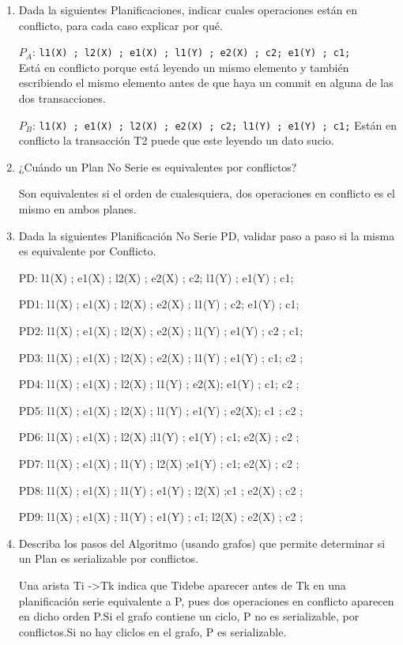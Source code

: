 \begin{enumerate}
\item Dada la siguientes Planificaciones, indicar cuales operaciones están en conflicto, para cada caso explicar por qué.

$P_A$: \texttt{l1(X) ; l2(X) ; e1(X) ; l1(Y) ; e2(X) ; c2; e1(Y) ; c1;}
\\
Está en conflicto porque está leyendo un mismo elemento y también escribiendo el mismo elemento antes de que haya un commit en alguna de las dos transacciones.

$P_B$: \texttt{l1(X) ; e1(X) ; l2(X) ; e2(X) ; c2; l1(Y) ; e1(Y) ; c1;} Están en conflicto la transacción T2 puede que este leyendo un dato sucio.

\item ¿Cuándo un Plan No Serie es equivalentes por conflictos?

Son equivalentes si el orden de cualesquiera, dos operaciones en conflicto es el mismo en ambos planes.

\item Dada la siguientes Planificación No Serie  PD, validar paso a paso si la misma es equivalente por Conflicto.

PD: l1(X) ; e1(X) ; l2(X) ; e2(X) ; c2; l1(Y) ; e1(Y) ; c1;

PD1: l1(X) ; e1(X) ; l2(X) ; e2(X) ; l1(Y) ; c2; e1(Y) ; c1;

PD2: l1(X) ; e1(X) ; l2(X) ; e2(X) ; l1(Y) ; e1(Y) ; c2 ; c1;

PD3: l1(X) ; e1(X) ; l2(X) ; e2(X) ; l1(Y) ; e1(Y) ; c1; c2 ; 

PD4: l1(X) ; e1(X) ; l2(X) ; l1(Y) ; e2(X); e1(Y) ; c1; c2 ; 

PD5: l1(X) ; e1(X) ; l2(X) ; l1(Y) ; e1(Y) ; e2(X); c1 ; c2 ; 

PD6: l1(X) ; e1(X) ; l2(X) ;l1(Y) ; e1(Y) ; c1; e2(X) ; c2 ; 

PD7: l1(X) ; e1(X) ; l1(Y) ; l2(X) ;e1(Y) ; c1; e2(X) ; c2 ; 

PD8: l1(X) ; e1(X) ; l1(Y) ; e1(Y) ; l2(X) ;c1 ; e2(X) ; c2 ; 

PD9: l1(X) ; e1(X) ; l1(Y) ; e1(Y) ; c1; l2(X) ; e2(X) ; c2 ;

\item Describa los pasos del Algoritmo (usando grafos) que permite determinar si un Plan es serializable por conflictos.

Una arista Ti ->Tk indica que Tidebe aparecer antes de Tk en una planificación serie equivalente a P, pues dos operaciones en conflicto aparecen en dicho orden P.Si el grafo contiene un ciclo, P no es serializable, por conflictos.Si no hay cliclos en el grafo, P es serializable.


\end{enumerate}
